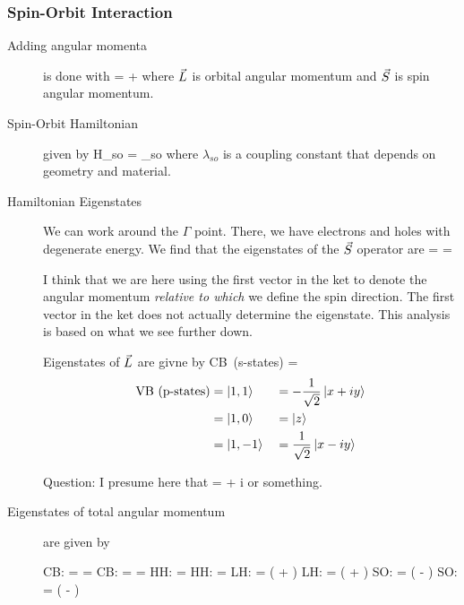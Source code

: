 \subsubsection{Spin-Orbit Interaction}
\begin{description}
\item[Adding angular momenta] is done with 
\beq
{} =  + 
\eeq
where $\vec{L}$ is orbital angular momentum and  $\vec{S}$ is spin angular momentum. 

\item[Spin-Orbit Hamiltonian] given by 
\beq
H_{so} = \lambda_{so}  \cdot {}
\eeq
where $\lambda_{so}$ is a coupling constant that depends on geometry and material. 

\item[Hamiltonian Eigenstates] We can work around the $\Gamma$ point. There, we have electrons and holes with degenerate energy. We find that the eigenstates of the $\vec{S}$ operator are
\beq
{} = \ket{\uparrow}
\eeq
\beq
{} = \ket{\uparrow}
\eeq

I think that we are here using the first vector in the ket to denote the angular momentum \emph{relative to which} we define the spin direction. The first vector in the ket does not actually determine the eigenstate. This analysis is based on what we see further down. 

Eigenstates of $\vec{L}$  are givne by 
\beq
\mbox{CB (s-states)} =   
\eeq
\begin{align}
\mbox{VB (p-states)} &= \left| 1,1 \right\rangle && = - \frac{1}{\sqrt{2}} \left| x + iy \right\rangle \\
&=\left| 1,0 \right\rangle &&= \left| z \right\rangle \\
&= \left| 1,-1 \right\rangle &&= \frac{1}{\sqrt{2}} \left| x - iy \right\rangle
\end{align}

Question: I presume here that
\beq
{} = \ket{+ } + i 
\eeq
or something. 

\item[Eigenstates of total angular momentum] are given by

\beq
CB: =   =  \ket{\uparrow}
\eeq
\beq
CB: =  =  \ket{\downarrow}
\eeq
\beq
HH: =  \ket{\uparrow} 
\eeq
\beq
HH:  =  \ket{\downarrow}
\eeq
\beq
LH:  =  \left(  \ket{ \downarrow } +   \ket{\uparrow} \right)
\eeq
\beq
LH:  =  \left(  \ket{\uparrow} +   \ket{\downarrow} \right)
\eeq
\beq
SO:  =  \left(  \ket{\uparrow}  -   \ket{\downarrow} \right)
\eeq
\beq
SO:  =  \left(  \ket{\downarrow} -   \ket{\uparrow } \right)
\eeq



\end{description}
